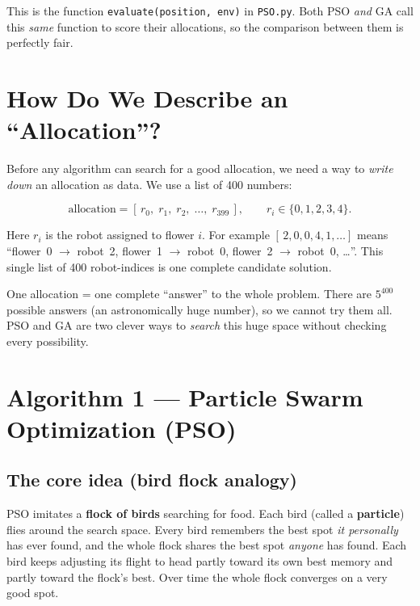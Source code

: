 \documentclass[11pt]{article}
\begin{document}
\begin{codebox}
This is the function \texttt{evaluate(position, env)} in \texttt{PSO.py}. Both
PSO \emph{and} GA call this \emph{same} function to score their allocations, so
the comparison between them is perfectly fair.
\end{codebox}

\section{How Do We Describe an ``Allocation''?}

Before any algorithm can search for a good allocation, we need a way to
\emph{write down} an allocation as data. We use a list of 400 numbers:

\[
\text{allocation} = [\,r_0,\; r_1,\; r_2,\; \dots,\; r_{399}\,],
\qquad r_i \in \{0,1,2,3,4\}.
\]

Here $r_i$ is the robot assigned to flower $i$. For example
$[\,2,0,0,4,1,\dots]$ means ``flower~0 $\to$ robot~2, flower~1 $\to$ robot~0,
flower~2 $\to$ robot~0, \dots''. This single list of 400 robot-indices is one
complete candidate solution.

\begin{intuition}
One allocation = one complete ``answer'' to the whole problem. There are
$5^{400}$ possible answers (an astronomically huge number), so we cannot try
them all. PSO and GA are two clever ways to \emph{search} this huge space
without checking every possibility.
\end{intuition}

\section{Algorithm 1 --- Particle Swarm Optimization (PSO)}

\subsection{The core idea (bird flock analogy)}

PSO imitates a \textbf{flock of birds} searching for food. Each bird (called a
\textbf{particle}) flies around the search space. Every bird remembers the best
spot \emph{it personally} has ever found, and the whole flock shares the best
spot \emph{anyone} has found. Each bird keeps adjusting its flight to head partly
toward its own best memory and partly toward the flock's best. Over time the
whole flock converges on a very good spot.
\end{document}
